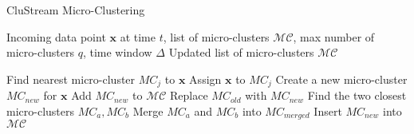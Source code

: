 \begin{algorithm}[ht]
    \caption{CluStream Micro-Clustering}
    \begin{algorithmic}[1]
        \REQUIRE Incoming data point $\mathbf{x}$ at time $t$, list of micro-clusters $\mathcal{MC}$, max number of micro-clusters $q$, time window $\Delta$
        \ENSURE Updated list of micro-clusters $\mathcal{MC}$

        \STATE Find nearest micro-cluster $MC_j$ to $\mathbf{x}$
        \STATE Assign $\mathbf{x}$ to $MC_j$
        \ELSE
        \STATE Create a new micro-cluster $MC_{new}$ for $\mathbf{x}$
        \STATE Add $MC_{new}$ to $\mathcal{MC}$
        \ELSE
        \STATE Replace $MC_{old}$ with $MC_{new}$
        \ELSE
        \STATE Find the two closest micro-clusters $MC_a, MC_b$
        \STATE Merge $MC_a$ and $MC_b$ into $MC_{merged}$
        \STATE Insert $MC_{new}$ into $\mathcal{MC}$
        \ENDIF
        \ENDIF
        \ENDIF
    \end{algorithmic}
\end{algorithm}

